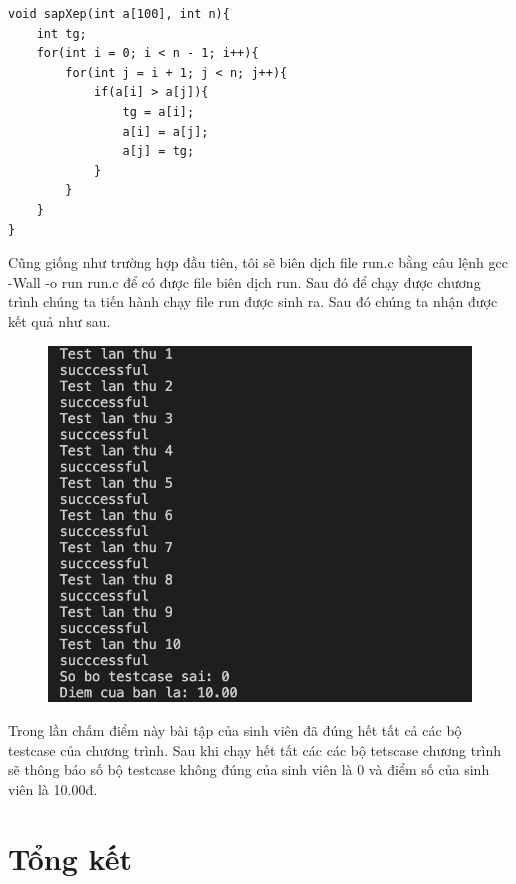 \documentclass[12pt,a4paper]{article}
\begin{document}
\begin{lstlisting}
void sapXep(int a[100], int n){
    int tg;
    for(int i = 0; i < n - 1; i++){
        for(int j = i + 1; j < n; j++){
            if(a[i] > a[j]){
                tg = a[i];
                a[i] = a[j];
                a[j] = tg;        
            }
        }
    }
}
\end{lstlisting}

Cũng giống như trường hợp đầu tiên, tôi sẽ biên dịch file run.c bằng câu lệnh gcc -Wall -o run run.c để có được file biên dịch run. Sau đó để chạy được chương trình chúng ta tiến hành chạy file run được sinh ra. Sau đó chúng ta nhận được kết quả như sau.

\begin{figure}[ht]
\begin{center}
\includegraphics[scale=.28]{hinhanh/ketquademoarraydung.png}
\end{center}
\end{figure}

Trong lần chấm điểm này bài tập của sinh viên đã đúng hết tất cả các bộ testcase của chương trình. Sau khi chạy hết tất các các bộ tetscase chương trình sẽ thông báo số bộ testcase không đúng của sinh viên là 0 và điểm số của sinh viên là 10.00đ. \newpage

\section{Tổng kết}
\end{document}
